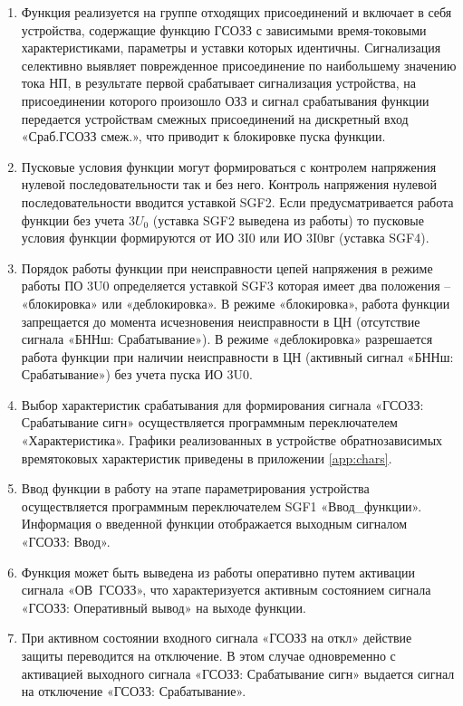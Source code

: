 \begin{enumerate}
\item 
Функция реализуется на группе отходящих присоединений и включает в себя устройства, содержащие функцию ГСОЗЗ с зависимыми время-токовыми характеристиками, параметры и уставки которых идентичны. Сигнализация селективно выявляет поврежденное присоединение по наибольшему значению тока НП, в результате первой срабатывает сигнализация устройства, на присоединении которого произошло ОЗЗ и сигнал срабатывания функции передается устройствам смежных присоединений на дискретный вход «Сраб.ГСОЗЗ смеж.», что приводит к блокировке пуска функции.

\item 
Пусковые условия функции могут формироваться с контролем напряжения нулевой последовательности так и без него. Контроль напряжения нулевой последовательности вводится уставкой SGF2. Если предусматривается работа функции без учета $3U_0$ (уставка SGF2 выведена из работы) то пусковые условия функции формируются от ИО 3I0 или ИО 3I0вг (уставка SGF4).

\item 
Порядок работы функции при неисправности цепей напряжения в режиме работы ПО 3U0 определяется уставкой SGF3 которая имеет два положения – «блокировка» или «деблокировка». В режиме «блокировка», работа функции запрещается до момента исчезновения неисправности в ЦН (отсутствие сигнала «БННш: Срабатывание»). В режиме «деблокировка» разрешается работа функции при наличии неисправности в ЦН (активный сигнал «БННш: Срабатывание») без учета пуска ИО 3U0.

\item
Выбор характеристик срабатывания для формирования сигнала «ГСОЗЗ: Срабатывание сигн» осуществляется программным переключателем «Характеристика». Графики реализованных в устройстве обратнозависимых времятоковых характеристик приведены в приложении \ref{app:chars}.

\item
Ввод функции в работу на этапе параметрирования устройства осуществляется программным переключателем SGF1 «Ввод\_функции». Информация о введенной функции отображается выходным сигналом «ГСОЗЗ: Ввод».
\item
Функция может быть выведена из работы оперативно путем активации сигнала «ОВ~ГСОЗЗ», что характеризуется активным состоянием сигнала «ГСОЗЗ: Оперативный вывод» на выходе функции.
 \item
При активном состоянии входного сигнала «ГСОЗЗ на откл» действие защиты переводится на отключение. В этом случае одновременно с активацией выходного сигнала «ГСОЗЗ: Срабатывание сигн» выдается сигнал на отключение «ГСОЗЗ: Срабатывание».


\end{enumerate}
